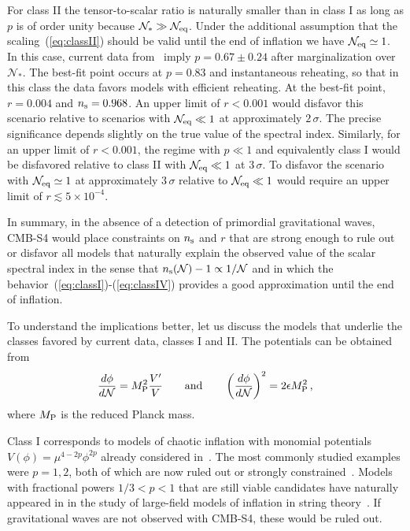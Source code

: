 For class II the tensor-to-scalar ratio is naturally smaller than in class I as long as $p$ is of order unity because $\mathcal{N}_\ast\gg\mathcal{N}_{\rm eq}$. Under the additional assumption that the scaling~(\ref{eq:classII}) should be valid until the end of inflation we have $\mathcal{N}_{\rm eq}\simeq 1$. In this case, current data from~\cite{Ade:2015tva} imply $p=0.67\pm0.24$ after marginalization over $\mathcal{N}_\ast$. The best-fit point occurs at $p=0.83$ and instantaneous reheating, so that in this class the data favors models with efficient reheating. At the best-fit point, $r=0.004$ and $n_{\rm s}=0.968$. An upper limit of $r<0.001$ would disfavor this scenario relative to scenarios with $\mathcal{N}_{\rm eq}\ll 1$ at approximately $2\,\sigma$. The precise significance depends slightly on the true value of the spectral index. Similarly, for an upper limit of $r<0.001$, the regime with $p\ll1$ and equivalently class I would be disfavored relative to class II with $\mathcal{N}_{\rm eq}\ll 1$ at $3\,\sigma$. To disfavor the scenario with $\mathcal{N}_{\rm eq}\simeq 1$ at approximately $3\,\sigma$ relative to $\mathcal{N}_{\rm eq}\ll 1$ would require an upper limit of $r\lesssim 5\times 10^{-4}$.  

In summary, in the absence of a detection of primordial gravitational waves, CMB-S4 would place constraints on $n_{\rm s}$ and $r$ that are strong enough to rule out or disfavor all models that naturally explain the observed value of the scalar spectral index in the sense that $n_{\rm s}(\mathcal{N})-1\propto 1/\mathcal{N}$ and in which the behavior~(\ref{eq:classI})-(\ref{eq:classIV}) provides a good approximation until the end of inflation. 

To understand the implications better, let us discuss the models that underlie the classes favored by current data, classes I and II. The  potentials can be obtained from 
\begin{equation}
\frac{d\phi}{d\mathcal{N}}=M_{\rm P}^2\frac{V'}{V}\qquad{\rm and}\qquad \left(\frac{d\phi}{d\mathcal{N}}\right)^2=2\epsilon M_{\rm P}^2\,,
\end{equation}
where $M_{\rm P}$ is the reduced Planck mass.

Class I corresponds to models of chaotic inflation with monomial potentials $V(\phi)=\mu^{4-2p}\phi^{2p}$
already considered in~\cite{Linde:1983gd}. The most commonly studied examples were $p=1,2$, both of which are now ruled out or strongly constrained~\cite{Ade:2015tva}. Models with fractional powers $1/3<p<1$ that are still viable candidates have naturally appeared in in the study of large-field models of inflation in string theory~\cite{Silverstein:2008sg,McAllister:2008hb,Flauger:2009ab}. If gravitational waves are not observed with CMB-S4, these would be ruled out.

